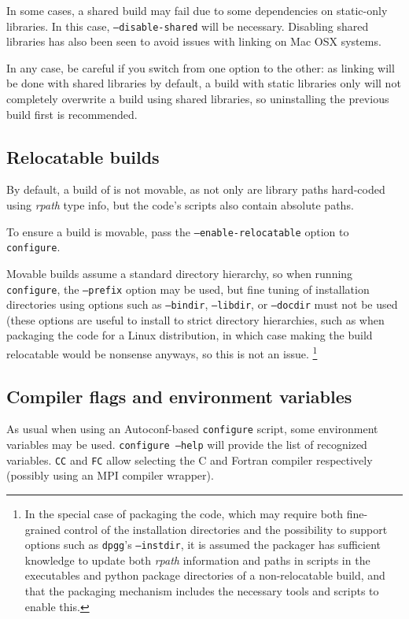 \documentclass[a4paper,10pt,twoside]{csshortdoc}
\begin{document}
In some cases, a shared build may fail due to some dependencies
on static-only libraries. In this case, {\tt --disable-shared}
will be necessary. Disabling shared libraries has also been seen
to avoid issues with linking on Mac OSX systems.

In any case, be careful if you switch from one option to the other: as
linking will be done with shared libraries by default, a build
with static libraries only will not completely overwrite a build using
shared libraries, so uninstalling the previous build first
is recommended.

\subsection{Relocatable builds\label{sec:config:relocatable}}

By default, a build of \CS is not movable, as not only
are library paths hard-coded using \emph{rpath} type info,
but the code's scripts also contain absolute paths.

To ensure a build is movable, pass the \texttt{--enable-relocatable} option
to {\tt configure}.

Movable builds assume a standard directory hierarchy, so when running
{\tt configure}, the \texttt{--prefix} option may be used, but fine tuning
of installation directories using options such as \texttt{--bindir},
\texttt{--libdir}, or \texttt{--docdir} must not be used
(these options are useful to install to strict directory hierarchies,
such as when packaging the code for a Linux distribution,
in which case making the build relocatable would be nonsense anyways,
so this is not an issue.
\footnote{In the special case of packaging the code, which
may require both fine-grained control of the installation directories
and the possibility to support options such as \texttt{dpgg}'s
\texttt{--instdir}, it is assumed the packager has sufficient knowledge to
update both \emph{rpath} information and paths in scripts in the executables
and python package directories of a non-relocatable build, and that the
packaging mechanism includes the necessary tools and scripts to enable this.}

\subsection{Compiler flags and environment variables\label{sec:config:flags}}

As usual when using an Autoconf-based \texttt{configure} script,
some environment variables may be used. \texttt{configure --help}
will provide the list of recognized variables.
\texttt{CC} and \texttt{FC} allow selecting the C and Fortran compiler
respectively (possibly using an MPI compiler wrapper).
\end{document}
